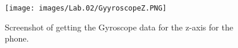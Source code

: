 \documentclass[idxtotoc,hyperref,openany]{labbook} %
\begin{document}
\begin{figure}[H] %
\begin{center}
\texttt{[image: images/Lab.02/GyyroscopeZ.PNG]}
\end{center}
\caption{Screenshot of getting the Gyroscope data for the z-axis for the phone.}
\label{fig:Lab02-GyroscopeZ}
\end{figure}














\end{document}

